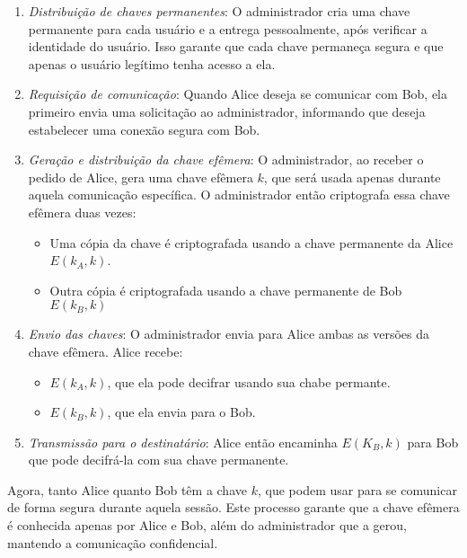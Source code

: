 \begin{enumerate}
\item {\em Distribuição de chaves permanentes}:
  O administrador cria uma chave permanente para cada usuário e a entrega pessoalmente, após verificar a identidade do usuário.
  Isso garante que cada chave permaneça segura e que apenas o usuário legítimo tenha acesso a ela.
  
\item {\em Requisição de comunicação}:
  Quando Alice deseja se comunicar com Bob, ela primeiro envia uma solicitação ao administrador, informando que deseja estabelecer uma conexão segura com Bob.

\item {\em Geração e distribuição da chave efêmera}:
  O administrador, ao receber o pedido de Alice, gera uma chave efêmera $k$, que será usada apenas durante aquela comunicação específica.
  O administrador então criptografa essa chave efêmera duas vezes:
  \begin{itemize}
  \item Uma cópia da chave é criptografada usando a chave permanente da Alice $E(k_A,k)$.
  \item Outra cópia é criptografada usando a chave permanente de Bob $E(k_B,k)$
  \end{itemize}
\item {\em Envio das chaves}:
  O administrador envia para Alice ambas as versões da chave efêmera.
  Alice recebe:
  \begin{itemize}
  \item $E(k_A,k)$, que ela pode decifrar usando sua chabe permante.
  \item $E(k_B,k)$, que ela envia para o Bob.
  \end{itemize}
\item {\em Transmissão para o destinatário}:
  Alice então encaminha $E(K_B,k)$ para Bob que pode decifrá-la com sua chave permanente.
\end{enumerate}

Agora, tanto Alice quanto Bob têm a chave $k$, que podem usar para se comunicar de forma segura durante aquela sessão.
Este processo garante que a chave efêmera é conhecida apenas por Alice e Bob, além do administrador que a gerou, mantendo a comunicação confidencial.

\begin{center}
\end{center}

